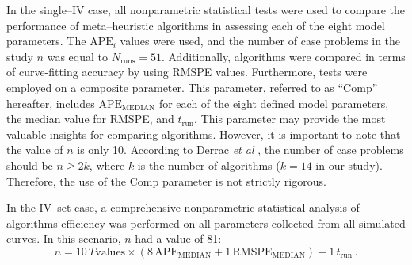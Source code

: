 \documentclass[a4paper,fleqn]{cas-dc}
\begin{document}
In the single--IV case, all nonparametric statistical tests were used to compare the performance of meta--heuristic algorithms in assessing each of the eight model parameters.
The $\mathrm{APE}_i$ values were used, and the number of case problems in the study $n$ was equal to $N_\mathrm{runs}=51$.
Additionally, algorithms were compared in terms of curve-fitting accuracy by using RMSPE values.
Furthermore, tests were employed on a composite parameter.
This parameter, referred to as ``Comp'' hereafter, includes $\mathrm{APE}_\mathrm{MEDIAN}$ for each of the eight defined model parameters,
the median value for RMSPE, and $t_\mathrm{run}$.
This parameter may provide the most valuable insights for comparing algorithms. However, it is important to note that the value of $n$ is only 10.
According to Derrac \emph{et al} \cite{Derrac2011}, the number of case problems should be $n\geq 2k$,
where $k$ is the number of algorithms ($k=14$ in our study).
Therefore, the use of the Comp parameter is not strictly rigorous.

In the IV--set case, a comprehensive nonparametric statistical analysis of algorithms efficiency was performed on all parameters collected from all simulated curves.
In this scenario, $n$ had a value of 81:
\begin{equation*}
n= 10\,T\mathrm{values}\times(8\,\mathrm{APE}_\mathrm{MEDIAN}+1\,\mathrm{RMSPE}_\mathrm{MEDIAN})+1\,t_\mathrm{run}\,.
\end{equation*}





\end{document}

